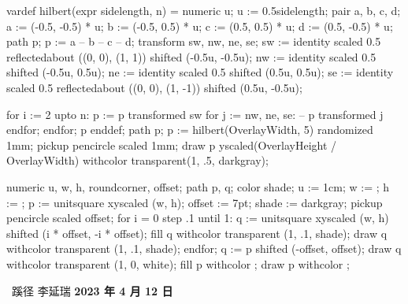 \setupinteraction[
  title={ConTeXt 蹊径},
  author={李延瑞 (lyr.m2@live.cn)},
  keyword={TeX, ConTeXt MkIV, ConTeXt LMTX, LuaTeX, LuaMetaTeX}
]
\startMPinclusions
vardef hilbert(expr sidelength, n) = 
  numeric u; u := 0.5sidelength;
  pair a, b, c, d;
  a := (-0.5, -0.5) * u;
  b := (-0.5, 0.5) * u;
  c := (0.5, 0.5) * u;
  d := (0.5, -0.5) * u;
  path p; 
  p := a -- b -- c -- d;
  transform sw, nw, ne, se;
  sw := identity
        scaled 0.5
        reflectedabout ((0, 0), (1, 1))
        shifted (-0.5u, -0.5u);
  nw := identity
        scaled 0.5
        shifted (-0.5u, 0.5u);
  ne := identity
        scaled 0.5
        shifted (0.5u, 0.5u);
  se := identity
        scaled 0.5
        reflectedabout ((0, 0), (1, -1))
        shifted (0.5u, -0.5u);

  for i := 2 upto n:
    p := p transformed sw for j := nw, ne, se: -- p transformed j endfor;
  endfor;
  p
enddef;
\stopMPinclusions
{}
path p; p := hilbert(OverlayWidth, 5) randomized 1mm;
pickup pencircle scaled 1mm;
draw p yscaled(OverlayHeight / OverlayWidth) withcolor transparent(1, .5, darkgray); %
\stopuseMPgraphic
{}

numeric u, w, h, roundcorner, offset;
path p, q;
color shade;
u := 1cm; w := \overlaywidth; h := \overlayheight;
p := unitsquare xyscaled (w, h);
offset := 7pt;
shade := darkgray;
pickup pencircle scaled offset;
for i = 0 step .1 until 1:
    q := unitsquare xyscaled (w, h) shifted (i * offset, -i * offset);
    fill q withcolor transparent (1, .1, shade);
    draw q withcolor transparent (1, .1, shade);
endfor;
q := p shifted (-offset, offset);
draw q withcolor transparent (1, 0, white);
fill p withcolor ;
draw p withcolor ;
\stopuniqueMPgraphic
{}

\setupbackgrounds[page][background=TitleGraphic]
\startstandardmakeup
  \startcolor[white]
    \startcoverbox[middle][width=.6\textwidth,height=5cm,toffset=.8cm]
      \strut
      \hfil \bfd\ConTeXt\ 蹊径\hfil
      \blank[1cm]
      \hfil\bfa 李延瑞\hfil
      \blank[.25cm]
      \hfil\bf 2023 年 4 月 12 日\hfil
    \stopcoverbox
  \stopcolor
  \blank[14cm]
\stopstandardmakeup
\setupbackgrounds[page][background=]